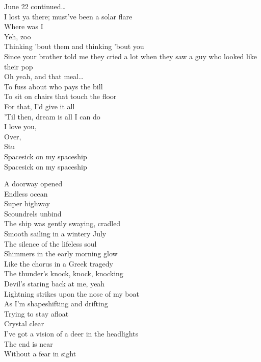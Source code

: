 
June 22 continued… \\
I lost ya there; must've been a solar flare \\
Where was I \\
Yeh, zoo \\
Thinking 'bout them and thinking 'bout you \\
Since your brother told me they cried a lot when they saw a guy who looked like their pop \\
Oh yeah, and that meal… \\
To fuss about who pays the bill \\
To sit on chairs that touch the floor \\
For that, I'd give it all \\
'Til then, dream is all I can do \\
I love you, \\
Over, \\
Stu \\

Spacesick on my spaceship \\
Spacesick on my spaceship \\




A doorway opened \\
Endless ocean \\
Super highway \\
Scoundrels unbind \\
The ship was gently swaying, cradled \\
Smooth sailing in a wintery July \\
The silence of the lifeless soul \\
Shimmers in the early morning glow \\
Like the chorus in a Greek tragedy \\
The thunder's knock, knock, knocking \\
Devil's staring back at me, yeah \\

Lightning strikes upon the nose of my boat \\
As I'm shapeshifting and drifting \\
Trying to stay afloat \\
Crystal clear \\
I've got a vision of a deer in the headlights \\
The end is near \\
Without a fear in sight \\


